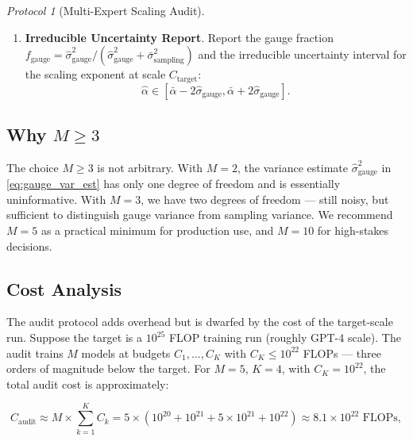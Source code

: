 \documentclass[12pt,a4paper]{article}
\theoremstyle{remark}
\newtheorem{protocol}[theorem]{Protocol}
\begin{document}
\begin{protocol}[Multi-Expert Scaling Audit]
\begin{enumerate}[label=Step \arabic*:, leftmargin=*]
\begin{equation}
    \label{eq:gauge_var_est}
    \end{equation}
    where $\bar{\alpha} = \frac{1}{M} \sum_m \hat{\alpha}_m$. If $\hat{\sigma}^2_{\text{gauge}} < 0$, set it to 0 (gauge variance is not significantly above sampling noise).
    \item \textbf{Irreducible Uncertainty Report}. Report the gauge fraction $f_{\text{gauge}} = \hat{\sigma}^2_{\text{gauge}} / (\hat{\sigma}^2_{\text{gauge}} + \bar{\sigma}^2_{\text{sampling}})$ and the irreducible uncertainty interval for the scaling exponent at scale $C_{\text{target}}$:
    \begin{equation}
    \hat{\alpha} \in [\bar{\alpha} - 2\hat{\sigma}_{\text{gauge}}, \bar{\alpha} + 2\hat{\sigma}_{\text{gauge}}].
    \label{eq:irreducible_interval}
    \end{equation}
\end{enumerate}
\end{protocol}

\subsection{Why $M \geq 3$}

The choice $M \geq 3$ is not arbitrary. With $M = 2$, the variance estimate $\hat{\sigma}^2_{\text{gauge}}$ in \eqref{eq:gauge_var_est} has only one degree of freedom and is essentially uninformative. With $M = 3$, we have two degrees of freedom — still noisy, but sufficient to distinguish gauge variance from sampling variance. We recommend $M = 5$ as a practical minimum for production use, and $M = 10$ for high-stakes decisions.

\subsection{Cost Analysis}

The audit protocol adds overhead but is dwarfed by the cost of the target-scale run. Suppose the target is a $10^{25}$ FLOP training run (roughly GPT-4 scale). The audit trains $M$ models at budgets $C_1, \dots, C_K$ with $C_K \leq 10^{22}$ FLOPs — three orders of magnitude below the target. For $M = 5$, $K = 4$, with $C_K = 10^{22}$, the total audit cost is approximately:

\begin{equation}
C_{\text{audit}} \approx M \times \sum_{k=1}^K C_k = 5 \times (10^{20} + 10^{21} + 5\times 10^{21} + 10^{22}) \approx 8.1 \times 10^{22} \text{ FLOPs},
\end{equation}
\end{document}

